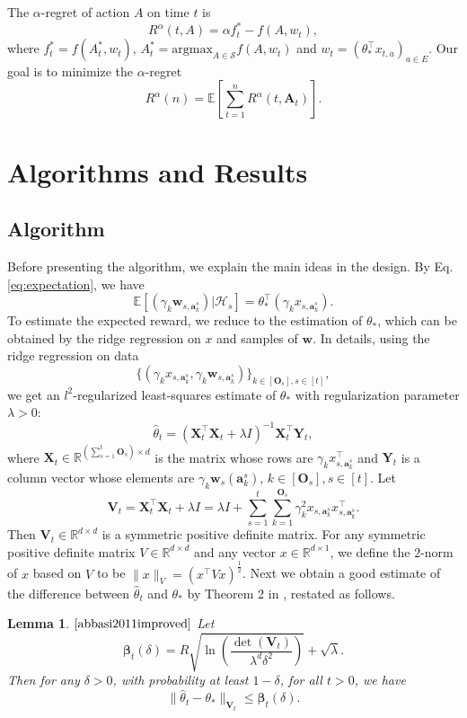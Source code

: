 \documentclass{article}
\newcommand{\bbeta}{\boldsymbol{\beta}}
\newcommand{\EE}{\mathbb{E}}
\newcommand{\RR}{\mathbb{R}}
\newcommand{\bA}{\mathbf{A}}
\newcommand{\ba}{\mathbf{a}}
\newcommand{\bO}{\mathbf{O}}
\newcommand{\bV}{\mathbf{V}}
\newcommand{\bw}{\mathbf{w}}
\newcommand{\bX}{\mathbf{X}}
\newcommand{\bY}{\mathbf{Y}}
\newcommand{\cH}{\mathcal{H}}
\newcommand{\cS}{\mathcal{S}}
\newcommand{\argmax}{\mathrm{argmax}}
\newcommand{\norm}[1]{\| #1 \|}
\newtheorem{lemma}[theorem]{Lemma}%
\begin{document}
The $\alpha$-regret of action $A$ on time $t$ is
$$
R^{\alpha}(t, A) = \alpha f_t^{\ast} - f(A, w_t),
$$
where $f_t^{\ast} = f(A_t^*, w_t)$, $A_t^* = \argmax_{A\in\cS} f(A, w_t)$ and $w_t = (\theta_{\ast}^{\top}x_{t,a})_{a \in E}$. Our goal is to minimize the $\alpha$-regret
$$
R^{\alpha}(n) = \EE[ \sum_{t=1}^n R^{\alpha}(t, \bA_t)].
$$
	
\section{Algorithms and Results}

\subsection{Algorithm}

Before presenting the algorithm, we explain the main ideas in the design. By Eq.\eqref{eq:expectation}, we have 
$$
  \EE[(\gamma_k \bw_{s,\ba_k^s}) | \cH_{s}] = \theta_*^{\top} (\gamma_k x_{s,\ba_k^s}).
$$
To estimate the expected reward, we reduce to the estimation of $\theta_{\ast}$, which can be obtained by the ridge regression on $x$ and samples of $\bw$. In details, using the ridge regression on data 
$$
  \{(\gamma_k x_{s,\ba_k^s}, \gamma_k \bw_{s,\ba_k^s})\}_{k \in[\bO_s], s\in[t]},
$$
we get an $l^2$-regularized least-squares estimate of $\theta_*$ with regularization parameter $\lambda > 0$:
\begin{equation}
  \hat{\theta}_t = (\bX_t^{\top}\bX_t + \lambda I)^{-1} \bX_t^{\top} \bY_t,
\end{equation}
where $\bX_t \in \RR^{(\sum_{s=1}^{t}\bO_s) \times d}$ is the matrix whose rows are $\gamma_k x_{s,\ba_k^s}^{\top}$ and $\bY_t$ is a column vector whose elements are $\gamma_k \bw_s(\ba_k^s)$, $k \in[\bO_s], s\in[t]$. Let
$$
  \bV_t = \bX_t^{\top} \bX_t + \lambda I = \lambda I + \sum_{s=1}^{t} \sum_{k=1}^{\bO_s} \gamma_k^2 x_{s,\ba_k^s}x_{s,\ba_k^s}^{\top}.
$$
Then $\bV_t \in \RR^{d \times d}$ is a symmetric positive definite matrix. For any symmetric positive definite matrix $V \in \RR^{d \times d} $ and any vector $x \in \RR^{d \times 1}$, we define the $2$-norm of $x$ based on $V$ to be $\norm{x}_V = (x^{\top} V x)^{\frac{1}{2}}$. Next we obtain a good estimate of the difference between $\hat{\theta}_t$ and $\theta_*$ by Theorem 2 in \cite{abbasi2011improved}, restated as follows.

\begin{lemma} $\mathrm{\cite{abbasi2011improved}}$ %
  \label{thm:theta_estimate}
  Let 
  \begin{equation}
    \bbeta_{t}(\delta) = R\sqrt{\ln\left(\frac{\det(\bV_{t})}{\lambda^d \delta^2}\right)} + \sqrt{\lambda}. \label{eq:definebeta}
  \end{equation}
  Then for any $\delta > 0$, with probability at least $1 - \delta$, for all $t > 0$, we have
  \begin{equation}
    \label{eq:estimateTheta}
    \norm{\hat{\theta}_t - \theta_{\ast}}_{\bV_{t}} \leq \bbeta_{t}(\delta).
  \end{equation}
\end{lemma}
\end{document}
